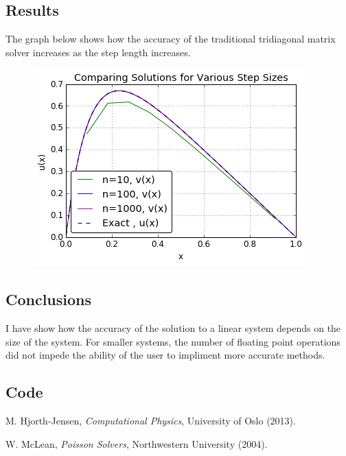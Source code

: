 \documentclass[11pt]{article}
\begin{document}
    

\subsection{Results}

    The graph below shows how the accuracy of the traditional tridiagonal matrix solver increases as the step length increases.

    \begin{figure}[h!] \begin{center}
    \includegraphics{setpsizechange.png}
    \end{center}  \end{figure}

\pagebreak
\subsection{Conclusions}

    I have show how the accuracy of the solution to a linear system depends on the size of the system. For smaller systems, the number of floating point operations did not impede the ability of the user to impliment more accurate methods.

\subsection{Code}

    

    

\begin{thebibliography}{1}

     M. Hjorth-Jensen, {\em Computational Physics}, University of Oslo (2013).

     W. McLean, {\em Poisson Solvers}, Northwestern University (2004).

\end{thebibliography}
\end{document}
